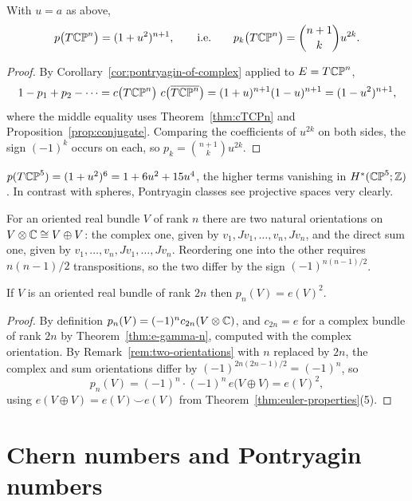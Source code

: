 \begin{theorem}\label{thm:pTCPn}
With $u=a$ as above,
\[
p\big(T\mathbb{CP}^n\big)=(1+u^2)^{n+1},
\qquad\text{i.e.}\qquad
p_k\big(T\mathbb{CP}^n\big)=\binom{n+1}{k}u^{2k}.
\]
\end{theorem}

\begin{proof}
By Corollary~\ref{cor:pontryagin-of-complex} applied to $E=T\mathbb{CP}^n$,
\[
1-p_1+p_2-\cdots
=c\big(T\mathbb{CP}^n\big)\ c\big(\overline{T\mathbb{CP}^n}\big)
=(1+u)^{n+1}(1-u)^{n+1}=(1-u^2)^{n+1},
\]
where the middle equality uses Theorem~\ref{thm:cTCPn} and
Proposition~\ref{prop:conjugate}. Comparing the coefficients of $u^{2k}$ on both
sides, the sign $(-1)^k$ occurs on each, so
$p_k=\binom{n+1}{k}u^{2k}$.
\end{proof}

\begin{example}
$p(T\mathbb{CP}^5)=(1+u^2)^6=1+6u^2+15u^4$, the higher terms vanishing in
$H^*(\mathbb{CP}^5;\mathbb{Z})$. In contrast with spheres, Pontryagin classes see projective
spaces very clearly.
\end{example}

\begin{remark}\label{rem:two-orientations}
For an oriented real bundle $V$ of rank $n$ there are two natural orientations
on $V\otimes\mathbb{C}\cong V\oplus V$: the complex one, given by
$v_1,Jv_1,\dots,v_n,Jv_n$, and the direct sum one, given by
$v_1,\dots,v_n,Jv_1,\dots,Jv_n$. Reordering one into the other requires
$n(n-1)/2$ transpositions, so the two differ by the sign $(-1)^{n(n-1)/2}$.
\end{remark}

\begin{lemma}\label{lem:pn-euler-square}
If $V$ is an oriented real bundle of rank $2n$ then $p_n(V)=e(V)^2$.
\end{lemma}

\begin{proof}
By definition $p_n(V)=(-1)^nc_{2n}(V\otimes\mathbb{C})$, and
$c_{2n}=e$ for a complex bundle of rank $2n$ by
Theorem~\ref{thm:e-gamma-n}, computed with the complex orientation. By
Remark~\ref{rem:two-orientations} with $n$ replaced by $2n$, the complex and sum
orientations differ by $(-1)^{2n(2n-1)/2}=(-1)^n$, so
\[
p_n(V)=(-1)^n\cdot(-1)^n\,e\big(V\oplus V\big)=e(V)^2,
\]
using $e(V\oplus V)=e(V)\smile e(V)$ from
Theorem~\ref{thm:euler-properties}(5).
\end{proof}

\section{Chern numbers and Pontryagin numbers}

